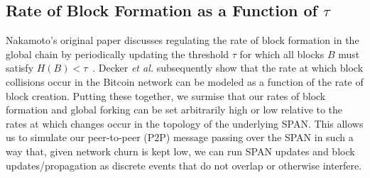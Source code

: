 \subsection{Rate of Block Formation as a Function of $\tau$}

Nakamoto's original paper discusses regulating the rate of block formation in
the global chain by
periodically updating the threshold $\tau$ for which all blocks $B$
must satisfy $H(B)<\tau$~\cite{nakamoto2008bitcoin}.
Decker \textit{et al.} subsequently show that the rate at which block collisions
occur in the Bitcoin network can be modeled as a function of the rate of block
creation. Putting these together, we surmise that our rates of block formation
and global forking can be set arbitrarily high or low relative to the rates at
which changes occur in the topology of the underlying SPAN. This allows us to
simulate our peer-to-peer (P2P) message passing over the SPAN in such
a way that, given network churn is kept low, we can run SPAN updates and
block updates/propagation as discrete events that do not overlap or otherwise
interfere.

